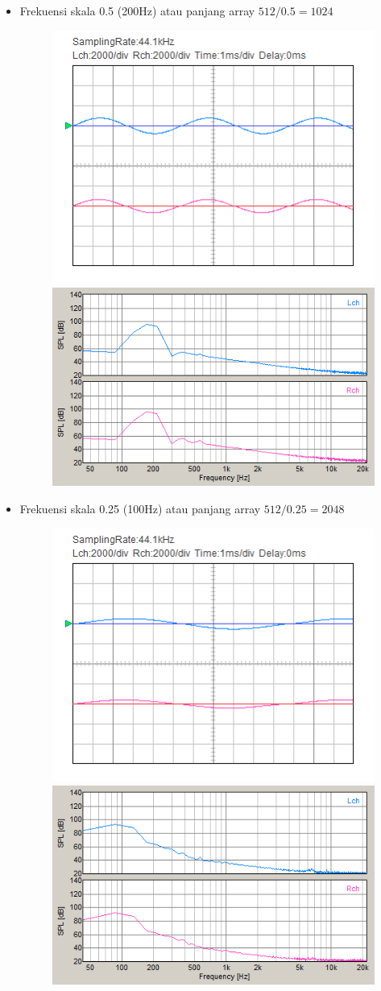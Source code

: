 \documentclass[12pt,]{article}
\begin{document}
\begin{itemize}
\begin{itemize}
			\newpage
			\item Frekuensi skala 0.5 (200Hz) atau panjang array $512/0.5=1024$
			\begin{figure}[H]
				\centering
				\includegraphics[width=0.45\linewidth]{result/day_4/osi_sine0p5}
				\includegraphics[width=0.45\linewidth]{result/day_4/fft_sine0p5}
			\end{figure}
		
			\item Frekuensi skala 0.25 (100Hz) atau panjang array $512/0.25=2048$
			\begin{figure}[H]
				\centering
				\includegraphics[width=0.45\linewidth]{result/day_4/osi_sine0p25}
				\includegraphics[width=0.45\linewidth]{result/day_4/fft_sine0p25}
			\end{figure}
		

\end{itemize}
\end{itemize}
\end{document}
